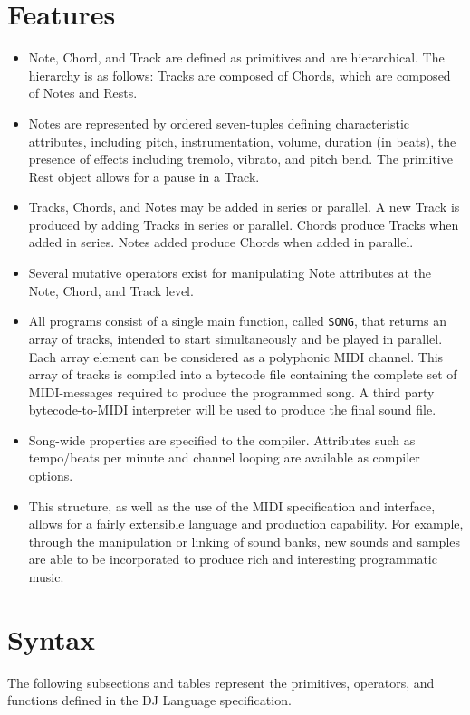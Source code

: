 \documentclass[letterpaper]{article}
\begin{document}
\section{Features}

\begin{itemize}
\item
Note, Chord, and Track are defined as primitives and are hierarchical. The hierarchy is as follows: Tracks are composed of Chords, which are composed of Notes and Rests.
\item
Notes are represented by ordered seven-tuples defining characteristic attributes, including pitch, instrumentation, volume, duration (in beats), the presence of effects including tremolo, vibrato, and pitch bend. The primitive Rest object allows for a pause in a Track.
\item
Tracks, Chords, and Notes may be added in series or parallel. A new Track is produced by adding Tracks in series or parallel. Chords produce Tracks when added in series. Notes added produce Chords when added in parallel.
\item
Several mutative operators exist for manipulating Note attributes at the Note, Chord, and Track level.
\item
All programs consist of a single main function, called \texttt{SONG}, that returns an array of tracks, intended to start simultaneously and be played in parallel. Each array element can be considered as a polyphonic MIDI channel. This array of tracks is compiled into a bytecode file containing the complete set of MIDI-messages required to produce the programmed song. A third party bytecode-to-MIDI interpreter will be used to produce the final sound file.
\item
Song-wide properties are specified to the compiler. Attributes such as tempo/beats per minute and channel looping are available as compiler options.
\item
This structure, as well as the use of the MIDI specification and interface, allows for a fairly extensible language and production capability. For example, through the manipulation or linking of sound banks, new sounds and samples are able to be incorporated to produce rich and interesting programmatic music.
\end{itemize}

\section{Syntax}

The following subsections and tables represent the primitives, operators, and functions defined in the DJ Language specification.
\end{document}
